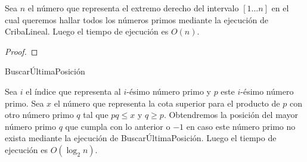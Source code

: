 \begin{lemma}
Sea $n$ el n\'umero que representa el extremo derecho del intervalo $[1 \dots n]$
en el cual queremos hallar todos los n\'umeros primos mediante la ejecuci\'on de CribaLineal. Luego el tiempo de ejecuci\'on es $O(n)$.
\end{lemma}

\begin{proof}
\end{proof}

\begin{algorithm}[H]
\SetAlgoLined
\DontPrintSemicolon
{}
\caption{Buscar\'UltimaPosici\'on\label{BUP}}
\end{algorithm}

\begin{lemma}
Sea $i$ el \'indice que representa al $i$-\'esimo n\'umero primo
y $p$ este $i$-\'esimo n\'umero primo.
Sea $x$ el n\'umero que representa la cota superior para el producto de $p$ con otro n\'umero primo $q$ tal que $pq \leq x$ y $q \geq p$.
Obtendremos la posici\'on del mayor n\'umero primo $q$ que cumpla con lo anterior o
$-1$ en caso este n\'umero primo no exista
mediante la ejecuci\'on de Buscar\'UltimaPosici\'on.
Luego el tiempo de ejecuci\'on es $O(\log_2 n)$.
\end{lemma}

